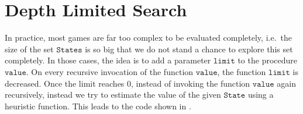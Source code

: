 \section{Depth Limited Search}
In practice, most games are far too complex to be evaluated completely, i.e.~the size of the set
$\mathtt{States}$ is so big that we do not stand a chance to explore this set completely.  In those cases, the
idea is to add a parameter $\mathtt{limit}$ to the procedure $\mathtt{value}$.  On every recursive invocation
of the function $\mathtt{value}$, the function $\mathtt{limit}$ is decreased.  Once the limit reaches $0$,
instead of invoking the function $\mathtt{value}$ again recursively, instead we try to estimate the value of
the given $\mathtt{State}$ using a heuristic function.  This leads to the code shown in .


